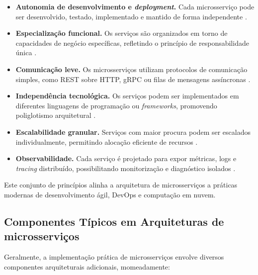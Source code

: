 \begin{itemize}
    \item \textbf{Autonomia de desenvolvimento e \textit{deployment}.} Cada microsserviço pode ser desenvolvido, testado, implementado e mantido de forma independente \cite{Newman2015}.
    
    \item \textbf{Especialização funcional.} Os serviços são organizados em torno de capacidades de negócio específicas, refletindo o princípio de responsabilidade única \cite{Newman2015}.
    
    \item \textbf{Comunicação leve.} Os microsserviços utilizam protocolos de comunicação simples, como REST sobre HTTP, gRPC ou filas de mensagens assíncronas \cite{Dragoni2017}.
    
    \item \textbf{Independência tecnológica.} Os serviços podem ser implementados em diferentes linguagens de programação ou \textit{frameworks}, promovendo poliglotismo arquitetural 
    \cite{Richardson2018}.
    
    \item \textbf{Escalabilidade granular.} Serviços com maior procura podem ser escalados individualmente, permitindo alocação eficiente de recursos \cite{Lewis2014}.
    
    \item \textbf{Observabilidade.} Cada serviço é projetado para expor métricas, logs e \textit{tracing} distribuído, possibilitando monitorização e diagnóstico isolados \cite{Soldani2018}.
\end{itemize}


Este conjunto de princípios alinha a arquitetura de microsserviços a práticas modernas de desenvolvimento ágil, DevOps e computação em nuvem.

\subsection{Componentes Típicos em Arquiteturas de microsserviços}

Geralmente, a implementação prática de microsserviços envolve diversos componentes arquiteturais adicionais, momeadamente:

